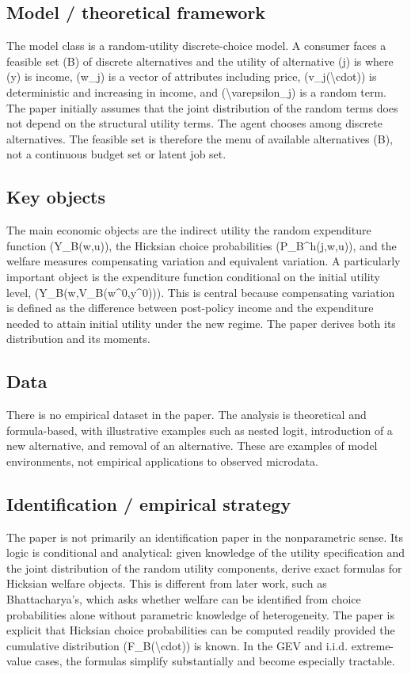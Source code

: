 \documentclass[11pt,a4paper]{article}
\begin{document}
\subsection*{Model / theoretical framework}
The model class is a random-utility discrete-choice model. A consumer faces a feasible set (B) of discrete alternatives and the utility of alternative (j) is where (y) is income, (w\_j) is a vector of attributes including price, (v\_j(\textbackslash{}cdot)) is deterministic and increasing in income, and (\textbackslash{}varepsilon\_j) is a random term. The paper initially assumes that the joint distribution of the random terms does not depend on the structural utility terms. The agent chooses among discrete alternatives. The feasible set is therefore the menu of available alternatives (B), not a continuous budget set or latent job set.

\subsection*{Key objects}
The main economic objects are the indirect utility the random expenditure function (Y\_B(w,u)), the Hicksian choice probabilities (P\_B\textasciicircum{}h(j,w,u)), and the welfare measures compensating variation and equivalent variation. A particularly important object is the expenditure function conditional on the initial utility level, (Y\_B(w,V\_B(w\textasciicircum{}0,y\textasciicircum{}0))). This is central because compensating variation is defined as the difference between post-policy income and the expenditure needed to attain initial utility under the new regime. The paper derives both its distribution and its moments.

\subsection*{Data}
There is no empirical dataset in the paper. The analysis is theoretical and formula-based, with illustrative examples such as nested logit, introduction of a new alternative, and removal of an alternative. These are examples of model environments, not empirical applications to observed microdata.

\subsection*{Identification / empirical strategy}
The paper is not primarily an identification paper in the nonparametric sense. Its logic is conditional and analytical: given knowledge of the utility specification and the joint distribution of the random utility components, derive exact formulas for Hicksian welfare objects. This is different from later work, such as Bhattacharya’s, which asks whether welfare can be identified from choice probabilities alone without parametric knowledge of heterogeneity. The paper is explicit that Hicksian choice probabilities can be computed readily provided the cumulative distribution (F\_B(\textbackslash{}cdot)) is known. In the GEV and i.i.d. extreme-value cases, the formulas simplify substantially and become especially tractable.
\end{document}

